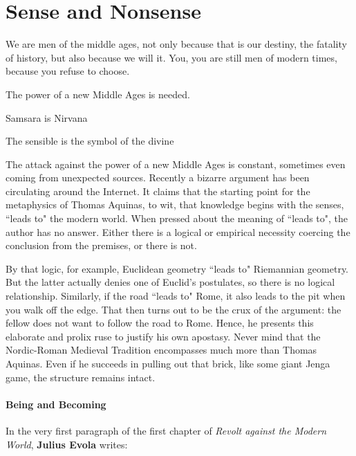 \section{Sense and Nonsense}

\begin{quotex}
We are men of the middle ages, not only because that is our destiny, the fatality of history, but also because we will it. You, you are still men of modern times, because you refuse to choose. 

The power of a new Middle Ages is needed. 

Samsara is Nirvana 

The sensible is the symbol of the divine 

\end{quotex}
The attack against the power of a new Middle Ages is constant, sometimes even coming from unexpected sources. Recently a bizarre argument has been circulating around the Internet. It claims that the starting point for the metaphysics of Thomas Aquinas, to wit, that knowledge begins with the senses, ``leads to" the modern world. When pressed about the meaning of ``leads to", the author has no answer. Either there is a logical or empirical necessity coercing the conclusion from the premises, or there is not.

By that logic, for example, Euclidean geometry ``leads to" Riemannian geometry. But the latter actually denies one of Euclid's postulates, so there is no logical relationship. Similarly, if the road ``leads to" Rome, it also leads to the pit when you walk off the edge. That then turns out to be the crux of the argument: the fellow does not want to follow the road to Rome. Hence, he presents this elaborate and prolix ruse to justify his own apostasy. Never mind that the Nordic-Roman Medieval Tradition encompasses much more than Thomas Aquinas. Even if he succeeds in pulling out that brick, like some giant Jenga game, the structure remains intact.

\paragraph{Being and Becoming}
In the very first paragraph of the first chapter of \emph{Revolt against the Modern World}, \textbf{Julius Evola} writes:


